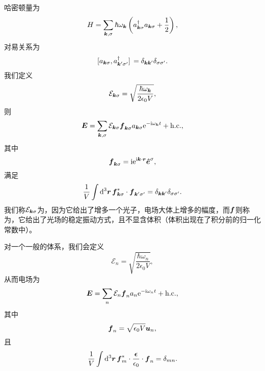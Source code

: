 哈密顿量为
\begin{equation}
    H = \sum_{\vb*{k}, \sigma} \hbar \omega_{\vb*{k}} \left( a^\dagger_{\vb*{k} \sigma} a_{\vb*{k} \sigma} + \frac{1}{2} \right),
\end{equation}
对易关系为
\begin{equation}
    \comm*{a_{\vb*{k} \sigma}}{a_{\vb*{k}' \sigma'}^\dagger} = \delta_{\vb*{k} \vb*{k}'} \delta_{\sigma \sigma'}.
\end{equation}
我们定义
\begin{equation}
    \mathcal{E}_{\vb*{k} \sigma} = \sqrt{\frac{\hbar \omega_{\vb*{k}}}{2 \epsilon_0 V}},
\end{equation}
则
\begin{equation}
    \vb*{E} = \sum_{\vb*{k}, \sigma} \mathcal{E}_{\vb*{k} \sigma} \vb*{f}_{\vb*{k} \sigma} a_{\vb*{k} \sigma} \mathrm{e}^{- \mathrm{i} \omega_{\vb*{k}} t} + \text{h.c.},
\end{equation}
其中
\begin{equation}
    \vb*{f}_{\vb*{k} \sigma} = \mathrm{i} \mathrm{e}^{\mathrm{i} \vb*{k} \cdot \vb*{r}} \vu*{e}^\sigma,
\end{equation}
满足
\begin{equation}
    \frac{1}{V} \int \dd[3]{\vb*{r}} \vb*{f}^*_{\vb*{k} \sigma} \cdot \vb*{f}_{\vb*{k}' \sigma'} = \delta_{\vb*{k} \vb*{k}'} \delta_{\sigma \sigma'}.
\end{equation}
我们称$\mathcal{E}_{\vb*{k} \sigma}$为，因为它给出了增多一个光子，电场大体上增多的幅度，而$\vb*{f}$则称为，它给出了光场的稳定振动方式，且不显含体积（体积出现在了积分前的归一化常数中）。

对一个一般的体系，我们会定义
\begin{equation}
    \mathcal{E}_{n} = \sqrt{\frac{\hbar \omega_n}{2 \epsilon_0 V}},
\end{equation}
从而电场为
\begin{equation}
    \vb*{E} = \sum_n \mathcal{E}_n \vb*{f}_{n} a_n \mathrm{e}^{- \mathrm{i} \omega_n t} + \text{h.c.},
    \label{eq:general-optical-field}
\end{equation}
其中
\begin{equation}
    \vb*{f}_n = \sqrt{\epsilon_0 V} \vb*{u}_n,
\end{equation}
且
\begin{equation}
    \frac{1}{V} \int \dd[3]{\vb*{r}} \vb*{f}_m^* \cdot \frac{\vb*{\epsilon}}{\epsilon_0} \cdot \vb*{f}_n = \delta_{mn}.
\end{equation}

